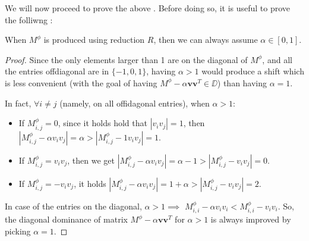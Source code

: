 We will now proceed to prove the above . Before doing so, it is useful to prove the folliwng :

\begin{lemma}
	\label{lemma:alpha_0_1}
	When $M^\phi$ is produced using reduction $R$, then we can always assume $\alpha\in[0,1]$.
\end{lemma}
\begin{proof}
	Since the only elements larger than 1 are on the diagonal of $M^\phi$, and all the entries offdiagonal are in $\{-1, 0, 1\}$, having $\alpha>1$ would produce a shift which is less convenient (with the goal of having $M^\phi - \alpha \mathbf{vv}^T \in \DD$) than having $\alpha=1$.
	
	In fact, $\forall i\neq j$ (namely, on all offidagonal entries), when $\alpha>1$:
	\begin{itemize}
		\item If $M^\phi_{i,j} = 0$, since it holds hold that $|v_i v_j| = 1$, then $|M^\phi_{i,j} - \alpha v_i v_j| = \alpha > |M^\phi_{i,j} - 1 v_i v_j| = 1$.

		\item If $M^\phi_{i,j} = v_i v_j$, then we get $|M^\phi_{i,j} - \alpha v_i v_j| = \alpha - 1 > |M^\phi_{i,j} - v_i v_j| = 0$.

		\item If $M^\phi_{i,j} = - v_i v_j$, it holds $|M^\phi_{i,j} - \alpha v_i v_j| = 1 + \alpha > |M^\phi_{i,j} - v_i v_j| = 2$.
	\end{itemize}
	
	In case of the entries on the diagonal, $\alpha > 1 \implies$ $M^\phi_{i,i} - \alpha v_i v_i < M^\phi_{i,i} - v_i v_i$. So, the diagonal dominance of matrix $M^\phi - \alpha \mathbf{v v}^T$ for $\alpha>1$ is always improved by picking $\alpha=1$.
\end{proof}


